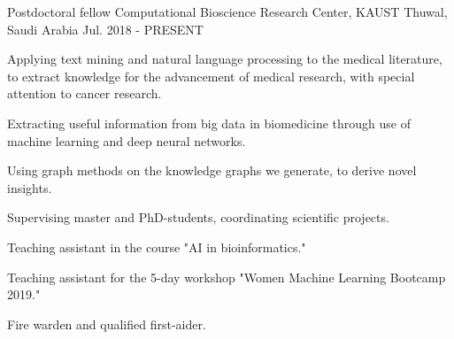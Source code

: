 

\begin{cventries}
  \cventry
    {Postdoctoral fellow} %
    {Computational Bioscience Research Center, KAUST} %
    {Thuwal, Saudi Arabia} %
    {Jul. 2018 - PRESENT} %
    {
      \begin{cvitems} %
        \item {Applying text mining and natural language processing to the medical literature, to extract knowledge for the advancement of medical research, with special attention to cancer research.}
        \item {Extracting useful information from big data in biomedicine through use of machine learning and deep neural networks.}
        \item {Using graph methods on the knowledge graphs we
            generate, to derive novel insights.}
      \item {Supervising master and PhD-students, coordinating
          scientific projects.}
      \item {Teaching assistant in the course "AI in bioinformatics."}
      \item {Teaching assistant for the 5-day workshop "Women Machine
          Learning Bootcamp 2019."}
      \item {Fire warden and qualified first-aider.}
      \end{cvitems}
    }


\end{cventries}
